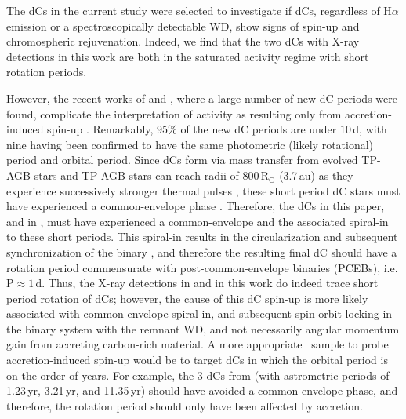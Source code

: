 \documentclass[twocolumn, tighten, times, astrosymb]{aastex631}
\begin{document}
The dCs in the current study were selected to investigate if dCs, regardless of H$\alpha$ emission or a spectroscopically detectable WD, show signs of spin-up and chromospheric rejuvenation. Indeed, we find that the two dCs with X-ray detections in this work are both in the saturated activity regime with short rotation periods. 

However, the recent works of \citet{Roulston2021a} and \citet{Whitehouse2021}, where  a large number of new dC periods were found, complicate the interpretation of activity as resulting only from accretion-induced spin-up \citep{Green2019}. Remarkably, 95\% of the new dC periods are under $10$\,d, with nine having been confirmed to have the same photometric (likely rotational) period and orbital period. Since dCs form via mass transfer from evolved TP-AGB stars and TP-AGB stars can reach radii of 800\,R$_\odot$ (3.7\,au) as they experience successively stronger thermal pulses \citep{Marigo2017}, these short period dC stars must have experienced a common-envelope phase \citep{Paczynski1976, Ivanova2013}. Therefore, the dCs in this paper, and in \citet{Green2019}, must have experienced a common-envelope  and the associated spiral-in to these short periods. This spiral-in results in the circularization and subsequent synchronization of the binary \citep{Hurley2002}, and therefore the resulting final dC should have a rotation period commensurate with post-common-envelope binaries (PCEBs), i.e. P$\approx1$\,d. Thus, the X-ray detections in \citet{Green2019} and in this work do indeed trace short period rotation of dCs; however, the cause of this dC spin-up is more likely associated with common-envelope spiral-in, and subsequent spin-orbit locking in the binary system with the remnant WD, and not necessarily angular momentum gain from accreting carbon-rich material. A more appropriate \Chandra\ sample to probe accretion-induced spin-up would be to target dCs in which the orbital period is on the order of years.  For example, the 3 dCs from \citet{Harris2018} (with astrometric periods of  1.23\,yr, 3.21\,yr, and 11.35\,yr) should have avoided a common-envelope phase, and therefore, the rotation period should only have been affected by accretion. 


\end{document}
